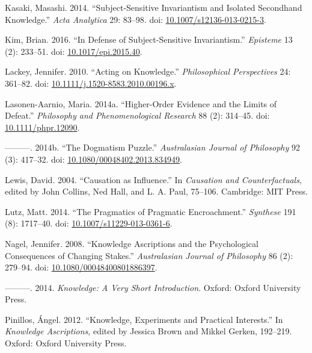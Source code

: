 \documentclass[
  11pt,
  letterpaper,
  DIV=11,
  numbers=noendperiod,
  twoside]{scrartcl}
\newlength{\cslhangindent}
\newenvironment{CSLReferences}[2] %
 {\begin{list}{}{%
  \setlength{\itemindent}{0pt}
  \setlength{\leftmargin}{0pt}
  \setlength{\parsep}{0pt}
  \ifodd #1
   \setlength{\leftmargin}{\cslhangindent}
   \setlength{\itemindent}{-1\cslhangindent}
  \fi
  \setlength{\itemsep}{#2\baselineskip}}}
 {\end{list}}
\begin{document}
\begin{CSLReferences}{1}{0}
Kasaki, Masashi. 2014. {``Subject-Sensitive Invariantism and Isolated
Secondhand Knowledge.''} \emph{Acta Analytica} 29: 83--98. doi:
\href{https://doi.org/10.1007/s12136-013-0215-3}{10.1007/s12136-013-0215-3}.

Kim, Brian. 2016. {``In Defense of Subject-Sensitive Invariantism.''}
\emph{Episteme} 13 (2): 233--51. doi:
\href{https://doi.org/10.1017/epi.2015.40}{10.1017/epi.2015.40}.

Lackey, Jennifer. 2010. {``Acting on Knowledge.''} \emph{Philosophical
Perspectives} 24: 361--82. doi:
\href{https://doi.org/10.1111/j.1520-8583.2010.00196.x}{10.1111/j.1520-8583.2010.00196.x}.

Lasonen-Aarnio, Maria. 2014a. {``Higher-Order Evidence and the Limits of
Defeat.''} \emph{Philosophy and Phenomenological Research} 88 (2):
314--45. doi:
\href{https://doi.org/10.1111/phpr.12090}{10.1111/phpr.12090}.

---------. 2014b. {``The Dogmatism Puzzle.''} \emph{Australasian Journal
of Philosophy} 92 (3): 417--32. doi:
\href{https://doi.org/10.1080/00048402.2013.834949}{10.1080/00048402.2013.834949}.

Lewis, David. 2004. {``Causation as Influence.''} In \emph{Causation and
Counterfactuals}, edited by John Collins, Ned Hall, and L. A. Paul,
75--106. Cambridge: {MIT} Press.

Lutz, Matt. 2014. {``The Pragmatics of Pragmatic Encroachment.''}
\emph{Synthese} 191 (8): 1717--40. doi:
\href{https://doi.org/10.1007/s11229-013-0361-6}{10.1007/s11229-013-0361-6}.

Nagel, Jennifer. 2008. {``Knowledge Ascriptions and the Psychological
Consequences of Changing Stakes.''} \emph{Australasian Journal of
Philosophy} 86 (2): 279--94. doi:
\href{https://doi.org/10.1080/00048400801886397}{10.1080/00048400801886397}.

---------. 2014. \emph{Knowledge: A Very Short Introduction}. Oxford:
Oxford University Press.

Pinillos, Ángel. 2012. {``Knowledge, Experiments and Practical
Interests.''} In \emph{Knowledge Ascriptions}, edited by Jessica Brown
and Mikkel Gerken, 192--219. Oxford: Oxford University Press.


\end{CSLReferences}
\end{document}
